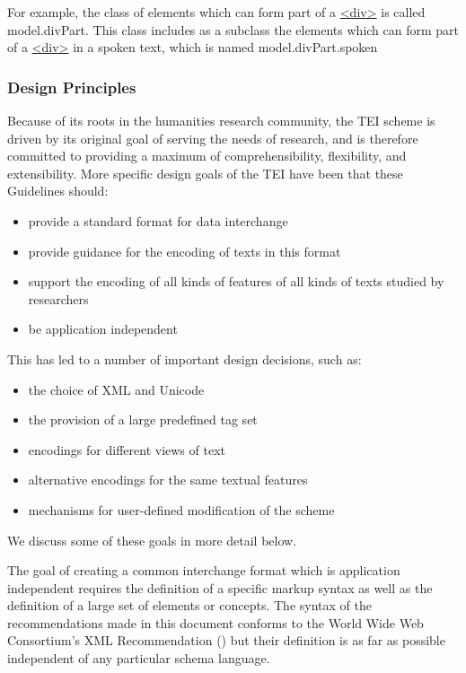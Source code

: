 For example, the class of elements which can form part of a \hyperref[TEI.div]{<div>} is called \textsf{model.divPart}. This class includes as a subclass the elements which can form part of a \hyperref[TEI.div]{<div>} in a spoken text, which is named \textsf{model.divPart.spoken}
\subsubsection[{Design Principles}]{Design Principles}\label{ABTEI2}\par
Because of its roots in the humanities research community, the TEI scheme is driven by its original goal of serving the needs of research, and is therefore committed to providing a maximum of comprehensibility, flexibility, and extensibility. More specific design goals of the TEI have been that these Guidelines should: \begin{itemize}
\item provide a standard format for data interchange
\item provide guidance for the encoding of texts in this format
\item support the encoding of all kinds of features of all kinds of texts studied by researchers
\item be application independent
\end{itemize}  This has led to a number of important design decisions, such as: \begin{itemize}
\item the choice of XML and Unicode
\item the provision of a large predefined tag set
\item encodings for different views of text
\item alternative encodings for the same textual features
\item mechanisms for user-defined modification of the scheme
\end{itemize}  We discuss some of these goals in more detail below.\par
The goal of creating a common interchange format which is application independent requires the definition of a specific markup syntax as well as the definition of a large set of elements or concepts. The syntax of the recommendations made in this document conforms to the World Wide Web Consortium's XML Recommendation (\cite{XMLREC}) but their definition is as far as possible independent of any particular schema language.\par
